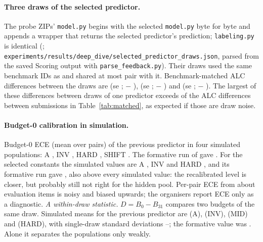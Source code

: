 \documentclass{article}
\begin{document}
\paragraph{Three draws of the selected predictor.} The probe ZIPs' \texttt{model.py} begins with the selected \texttt{model.py} byte for byte and appends a wrapper that returns the selected predictor's prediction; \texttt{labeling.py} is identical (\SdSameCode; \texttt{experiments/results/deep\_dive/selected\_predictor\_draws.json}, parsed from the saved Scoring output with \texttt{parse\_feedback.py}). Their draws used the same \SdSharedBenchMin{} benchmark IDs as \SelId{} and shared at most \SdSharedPairsMax{} pair with it. Benchmark-matched ALC differences between the draws are \SdMatchTwoOneMean{} (se \SdMatchTwoOneSe; \SdDrawTwoId{} $-$ \SdDrawOneId), \SdMatchThreeOneMean{} (se \SdMatchThreeOneSe; \SdDrawThreeId{} $-$ \SdDrawOneId) and \SdMatchThreeTwoMean{} (se \SdMatchThreeTwoSe; \SdDrawThreeId{} $-$ \SdDrawTwoId). The largest of these differences between draws of one predictor exceeds \SdMatchNBetweenBelow{} of the \SdMatchNBetween{} ALC differences between submissions in Table~\ref{tab:matched}, as expected if those are draw noise.

\paragraph{Budget-0 calibration in simulation.} Budget-0 ECE (mean over pairs) of the previous predictor in four simulated populations: A \DdEceBZeroShipA, INV \DdEceBZeroShipInv, HARD \DdEceBZeroShipHard, SHIFT \DdEceBZeroShipShift. The formative run of \FmShipId{} gave \FmShipEceBZero. For the selected constants the simulated values are A \DdEceBZeroSelA, INV \DdEceBZeroSelInv{} and HARD \DdEceBZeroSelHard, and its formative run gave \FmSelEceBZero, also above every simulated value: the recalibrated level is closer, but probably still not right for the hidden pool. Per-pair ECE from about \FmSelItemsPerPair{} evaluation items is noisy and biased upwards; the organisers report ECE only as a diagnostic. \emph{A within-draw statistic.} $D=B_0-B_{31}$ compares two budgets of the same draw. Simulated means for the previous predictor are \DdDA{} (A), \DdDInv{} (INV), \DdDMid{} (MID) and \DdDHard{} (HARD), with single-draw standard deviations \DdDSdMin--\DdDSdMax; the formative value was \FmShipD. Alone it separates the populations only weakly.
\end{document}

